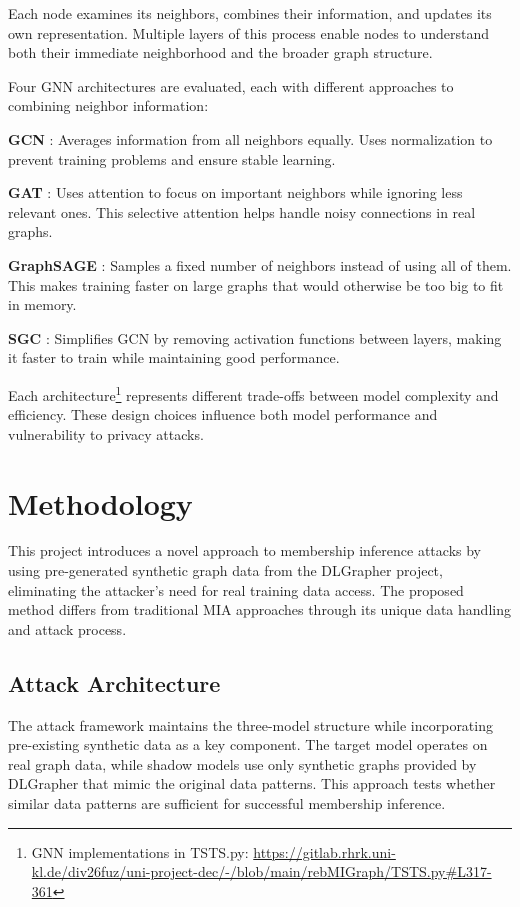 \documentclass{article}
\begin{document}
Each node examines its neighbors, combines their information, and updates its own representation. Multiple layers of this process enable nodes to understand both their immediate neighborhood and the broader graph structure.

Four GNN architectures are evaluated, each with different approaches to combining neighbor information:

\textbf{GCN} \cite{kipf2017semi}: Averages information from all neighbors equally. Uses normalization to prevent training problems and ensure stable learning.

\textbf{GAT} \cite{velickovic2018graph}: Uses attention to focus on important neighbors while ignoring less relevant ones. This selective attention helps handle noisy connections in real graphs.

\textbf{GraphSAGE} \cite{hamilton2017inductive}: Samples a fixed number of neighbors instead of using all of them. This makes training faster on large graphs that would otherwise be too big to fit in memory.

\textbf{SGC} \cite{wu2019simplifying}: Simplifies GCN by removing activation functions between layers, making it faster to train while maintaining good performance.

Each architecture\footnote{GNN implementations in TSTS.py: \url{https://gitlab.rhrk.uni-kl.de/div26fuz/uni-project-dec/-/blob/main/rebMIGraph/TSTS.py\#L317-361}} represents different trade-offs between model complexity and efficiency. These design choices influence both model performance and vulnerability to privacy attacks.

\section{Methodology}
This project introduces a novel approach to membership inference attacks by using pre-generated synthetic graph data from the DLGrapher project, eliminating the attacker's need for real training data access. The proposed method differs from traditional MIA approaches through its unique data handling and attack process.

\subsection{Attack Architecture}
The attack framework maintains the three-model structure while incorporating pre-existing synthetic data as a key component. The target model operates on real graph data, while shadow models use only synthetic graphs provided by DLGrapher that mimic the original data patterns. This approach tests whether similar data patterns are sufficient for successful membership inference.
\end{document}
